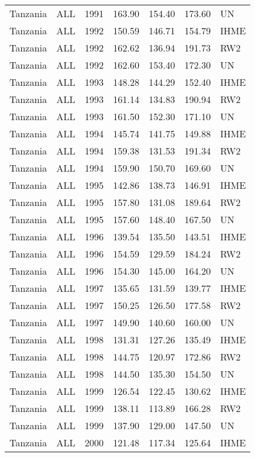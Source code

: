 \begin{longtable}{lllrrrl}
  Tanzania & ALL & 1991 & 163.90 & 154.40 & 173.60 & UN \\ 
  Tanzania & ALL & 1992 & 150.59 & 146.71 & 154.79 & IHME \\ 
  Tanzania & ALL & 1992 & 162.62 & 136.94 & 191.73 & RW2 \\ 
  Tanzania & ALL & 1992 & 162.60 & 153.40 & 172.30 & UN \\ 
  Tanzania & ALL & 1993 & 148.28 & 144.29 & 152.40 & IHME \\ 
  Tanzania & ALL & 1993 & 161.14 & 134.83 & 190.94 & RW2 \\ 
  Tanzania & ALL & 1993 & 161.50 & 152.30 & 171.10 & UN \\ 
  Tanzania & ALL & 1994 & 145.74 & 141.75 & 149.88 & IHME \\ 
  Tanzania & ALL & 1994 & 159.38 & 131.53 & 191.34 & RW2 \\ 
  Tanzania & ALL & 1994 & 159.90 & 150.70 & 169.60 & UN \\ 
  Tanzania & ALL & 1995 & 142.86 & 138.73 & 146.91 & IHME \\ 
  Tanzania & ALL & 1995 & 157.80 & 131.08 & 189.64 & RW2 \\ 
  Tanzania & ALL & 1995 & 157.60 & 148.40 & 167.50 & UN \\ 
  Tanzania & ALL & 1996 & 139.54 & 135.50 & 143.51 & IHME \\ 
  Tanzania & ALL & 1996 & 154.59 & 129.59 & 184.24 & RW2 \\ 
  Tanzania & ALL & 1996 & 154.30 & 145.00 & 164.20 & UN \\ 
  Tanzania & ALL & 1997 & 135.65 & 131.59 & 139.77 & IHME \\ 
  Tanzania & ALL & 1997 & 150.25 & 126.50 & 177.58 & RW2 \\ 
  Tanzania & ALL & 1997 & 149.90 & 140.60 & 160.00 & UN \\ 
  Tanzania & ALL & 1998 & 131.31 & 127.26 & 135.49 & IHME \\ 
  Tanzania & ALL & 1998 & 144.75 & 120.97 & 172.86 & RW2 \\ 
  Tanzania & ALL & 1998 & 144.50 & 135.30 & 154.50 & UN \\ 
  Tanzania & ALL & 1999 & 126.54 & 122.45 & 130.62 & IHME \\ 
  Tanzania & ALL & 1999 & 138.11 & 113.89 & 166.28 & RW2 \\ 
  Tanzania & ALL & 1999 & 137.90 & 129.00 & 147.50 & UN \\ 
  Tanzania & ALL & 2000 & 121.48 & 117.34 & 125.64 & IHME \\ 

\end{longtable}
